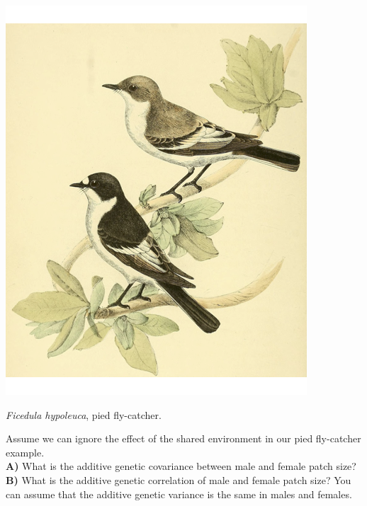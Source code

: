 \begin{marginfigure}
\begin{center}
\includegraphics[width=0.9
\textwidth]{illustration_images/Quant_gen/pied_fly_catcher/pied_fly_catcher.png}
\end{center}
\caption{{\it Ficedula hypoleuca}, pied fly-catcher.  } \label{fig:FlyCatcher}   %
\end{marginfigure}

\begin{question}{}
Assume we can ignore the effect of the shared environment in our pied fly-catcher example. \\
{\bf A)} What is the additive genetic covariance between male and female patch size?\\
{\bf B)} What is the additive genetic correlation of male and female patch size? You can assume that the additive genetic variance is the same in males and females.
\end{question}
